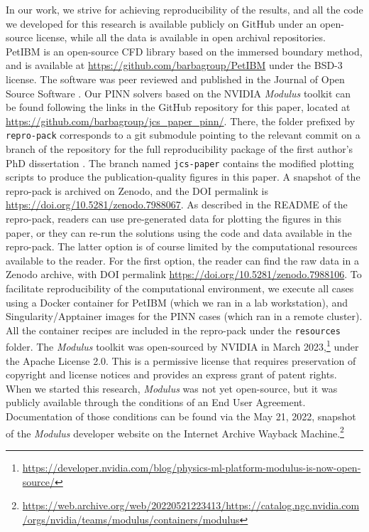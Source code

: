 
In our work, we strive for achieving reproducibility of the results, and all the code we developed for this research is available publicly on GitHub under an open-source license, while all the data is available in open archival repositories.
PetIBM is an open-source CFD library based on the immersed boundary method, and is available at \url{https://github.com/barbagroup/PetIBM} under the BSD-3 license. 
The software was peer reviewed and published in the Journal of Open Source Software \cite{chuang_petibm_2018}. 
Our PINN solvers based on the NVIDIA \emph{Modulus} toolkit can be found following the links in the GitHub repository for this paper, located at \url{https://github.com/barbagroup/jcs_paper_pinn/}. 
There, the folder prefixed by \texttt{repro-pack} corresponds to a git submodule pointing to the relevant commit on a branch of the repository for the full reproducibility package of the first author's PhD dissertation \cite{chuang_thesis_2023}.
The branch named \texttt{jcs-paper} contains the modified plotting scripts to produce the publication-quality figures in this paper.    
A snapshot of the repro-pack is archived on Zenodo, and the DOI permalink is \url{https://doi.org/10.5281/zenodo.7988067}.
As described in the README of the repro-pack, readers can use pre-generated data for plotting the figures in this paper, or they can re-run the solutions using the code and data available in the repro-pack.
The latter option is of course limited by the computational resources available to the reader.
For the first option, the reader can find the raw data in a Zenodo archive, with DOI permalink \url{https://doi.org/10.5281/zenodo.7988106}.
To facilitate reproducibility of the computational environment, we execute all cases using a Docker container for PetIBM (which we ran in a lab workstation), and Singularity/Apptainer images for the PINN cases (which ran in a remote cluster). 
All the container recipes are included in the repro-pack under the \texttt{resources} folder. 
The \emph{Modulus} toolkit was open-sourced by NVIDIA in March 2023,\footnote{\url{https://developer.nvidia.com/blog/physics-ml-platform-modulus-is-now-open-source/}} under the Apache License 2.0.
This is a permissive license that requires preservation of copyright and license notices and provides an express grant of patent rights. 
When we started this research, \emph{Modulus} was not yet open-source, but it was publicly available through the conditions of an End User Agreement. 
Documentation of those conditions can be found via the May 21, 2022, snapshot of the \emph{Modulus} developer website on the Internet Archive Wayback Machine.\footnote{\url{https://web.archive.org/web/20220521223413/https://catalog.ngc.nvidia.com/orgs/nvidia/teams/modulus/containers/modulus}}
